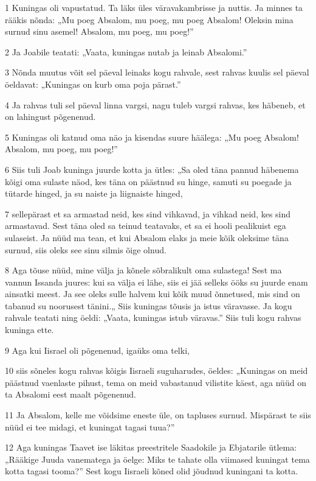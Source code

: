 \par 1 Kuningas oli vapustatud. Ta läks üles väravakambrisse ja nuttis. Ja minnes ta rääkis nõnda: „Mu poeg Absalom, mu poeg, mu poeg Absalom! Oleksin mina surnud sinu asemel! Absalom, mu poeg, mu poeg!”
\par 2 Ja Joabile teatati: „Vaata, kuningas nutab ja leinab Absalomi.”
\par 3 Nõnda muutus võit sel päeval leinaks kogu rahvale, sest rahvas kuulis sel päeval öeldavat: „Kuningas on kurb oma poja pärast.”
\par 4 Ja rahvas tuli sel päeval linna vargsi, nagu tuleb vargsi rahvas, kes häbeneb, et on lahingust põgenenud.
\par 5 Kuningas oli katnud oma näo ja kisendas suure häälega: „Mu poeg Absalom! Absalom, mu poeg, mu poeg!”
\par 6 Siis tuli Joab kuninga juurde kotta ja ütles: „Sa oled täna pannud häbenema kõigi oma sulaste näod, kes täna on päästnud su hinge, samuti su poegade ja tütarde hinged, ja su naiste ja liignaiste hinged,
\par 7 sellepärast et sa armastad neid, kes sind vihkavad, ja vihkad neid, kes sind armastavad. Sest täna oled sa teinud teatavaks, et sa ei hooli pealikuist ega sulaseist. Ja nüüd ma tean, et kui Absalom elaks ja meie kõik oleksime täna surnud, siis oleks see sinu silmis õige olnud.
\par 8 Aga tõuse nüüd, mine välja ja kõnele sõbralikult oma sulastega! Sest ma vannun Issanda juures: kui sa välja ei lähe, siis ei jää selleks ööks su juurde enam ainsatki meest. Ja see oleks sulle halvem kui kõik muud õnnetused, mis sind on tabanud su noorusest tänini.„ Siis kuningas tõusis ja istus väravasse. Ja kogu rahvale teatati ning öeldi: „Vaata, kuningas istub väravas.” Siis tuli kogu rahvas kuninga ette.
\par 9 Aga kui Iisrael oli põgenenud, igaüks oma telki,
\par 10 siis sõneles kogu rahvas kõigis Iisraeli suguharudes, öeldes: „Kuningas on meid päästnud vaenlaste pihust, tema on meid vabastanud vilistite käest, aga nüüd on ta Absalomi eest maalt põgenenud.
\par 11 Ja Absalom, kelle me võidsime eneste üle, on tapluses surnud. Mispärast te siis nüüd ei tee midagi, et kuningat tagasi tuua?”
\par 12 Aga kuningas Taavet ise läkitas preestritele Saadokile ja Ebjatarile ütlema: „Rääkige Juuda vanematega ja öelge: Miks te tahate olla viimased kuningat tema kotta tagasi tooma?” Sest kogu Iisraeli kõned olid jõudnud kuningani ta kotta.
